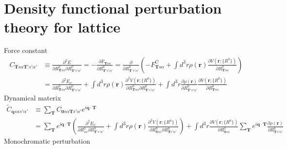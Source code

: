 \documentclass{article}
\begin{document}
\section{Density functional perturbation theory for lattice}

Force constant
\begin{align}
    C_{\textbf{T}s\alpha \textbf{T}'s'\alpha'} &\equiv 
    \frac{\partial^2 E}{\partial R^0_{\textbf{T}s\alpha} \partial R^0_{\textbf{T}'s'\alpha'}}
    = - \frac{\partial F_{\textbf{T}s\alpha}}{\partial R^0_{\textbf{T}'s'\alpha'}}
    = \frac{\partial}{\partial R^0_{\textbf{T}'s'\alpha'}}
    \left(-F_{\textbf{T}s\alpha}^\textrm{C} + \int d^3r \rho(\textbf{r}) 
    \frac{\partial V(\textbf{r}; \{R^0\}) }{\partial R^0_{\textbf{T}s\alpha}}\right)
    \nonumber \\
    &= 
    \frac{\partial^2 E_\textrm{C}}{\partial R^0_{\textbf{T}s\alpha} \partial R^0_{\textbf{T}'s'\alpha'}}
    +\int d^3r \rho(\textbf{r}) 
    \frac{\partial^2 V(\textbf{r}; \{R^0\}) }{\partial R^0_{\textbf{T}s\alpha} \partial R^0_{\textbf{T}'s'\alpha'}}
    +\int d^3r \frac{\partial \rho(\textbf{r})}{\partial R^0_{\textbf{T}'s'\alpha'}}
    \frac{\partial V(\textbf{r}; \{R^0\}) }{\partial R^0_{\textbf{T}s\alpha}}
\end{align}
Dynamical materix
\begin{align}
    \tilde{C}_{\textbf{q}s\alpha s'\alpha'} &\equiv
    \sum_{\textbf{T}}
    C_{\textbf{0}s\alpha \textbf{T}s'\alpha'}
    e^{i\textbf{q}\cdot\textbf{T}}
    \nonumber \\
    &=\sum_{\textbf{T}}
    e^{i\textbf{q}\cdot\textbf{T}}\left(
    \frac{\partial^2 E_\textrm{C}}{\partial R^0_{\textbf{}s\alpha} \partial R^0_{\textbf{T}'s'\alpha'}}
    +\int d^3r \rho(\textbf{r}) 
    \frac{\partial^2 V(\textbf{r}; \{R^0\}) }{\partial R^0_{\textbf{0}s\alpha} \partial R^0_{\textbf{T}s'\alpha'}}
    \right)
    +
    \int d^3r 
    \frac{\partial V(\textbf{r}; \{R^0\}) }{\partial R^0_{\textbf{0}s\alpha}}
    \sum_{\textbf{T}}
    e^{i\textbf{q}\cdot\textbf{T}}\frac{\partial \rho(\textbf{r})}{\partial R^0_{\textbf{T}s'\alpha'}}
\end{align}
Monochromatic perturbation
\end{document}
